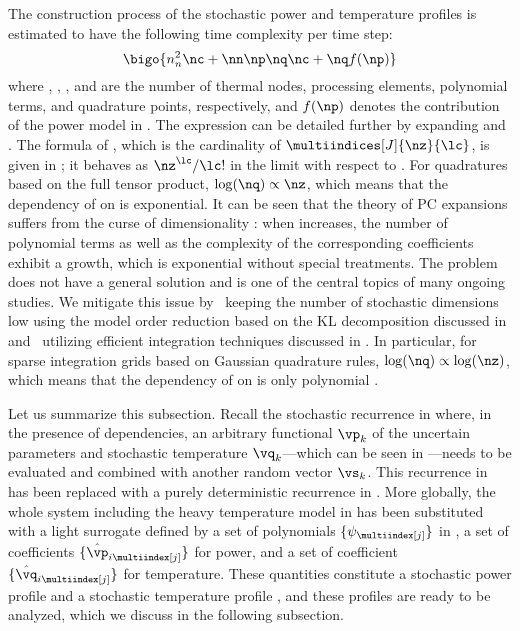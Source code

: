 The construction process of the stochastic power and temperature profiles is
estimated to have the following time complexity per time step:
\[
  \bigo{n_n^2 \nc + \nn \np \nq \nc + \nq f(\np)}
\]
where \nn, \np, \nc, and \nq are the number of thermal nodes, processing
elements, polynomial terms, and quadrature points, respectively, and $f(\np)$
denotes the contribution of the power model in . The
expression can be detailed further by expanding \nc and \nq. The formula of \nc,
which is the cardinality of $\multiindices[J]{\nz}{\lc}$, is given in
; it behaves as $\nz^\lc / \lc!$ in the
limit with respect to \nz. For quadratures based on the full tensor product,
$\log(\nq) \propto \nz$, which means that the dependency of \nq on \nz is
exponential. It can be seen that the theory of \ac{PC} expansions suffers from
the curse of dimensionality \cite{eldred2008, xiu2010}: when \nz increases, the
number of polynomial terms as well as the complexity of the corresponding
coefficients exhibit a growth, which is exponential without special treatments.
The problem does not have a general solution and is one of the central topics of
many ongoing studies. We mitigate this issue by \one~keeping the number of
stochastic dimensions low using the model order reduction based on the \ac{KL}
decomposition discussed in  and \two~utilizing
efficient integration techniques discussed in . In
particular, for sparse integration grids based on Gaussian quadrature rules,
$\log(\nq) \propto \log(\nz)$, which means that the dependency of \nq on \nz is
only polynomial \cite{heiss2008}.

Let us summarize this subsection. Recall the stochastic recurrence in
 where, in the presence of dependencies, an
arbitrary functional $\vp_k$ of the uncertain parameters \vu and stochastic
temperature $\vq_k$---which can be seen in ---needs to
be evaluated and combined with another random vector $\vs_k$. This recurrence in
 has been replaced with a purely deterministic
recurrence in . More globally, the whole system including
the heavy temperature model in  has been
substituted with a light surrogate defined by a set of polynomials $\{
\psi_{\multiindex[j]} \}$ in \vz, a set of coefficients $\{ \hat{\vp}_{i
\multiindex[j]} \}$ for power, and a set of coefficient $\{ \hat{\vq}_{i
\multiindex[j]} \}$ for temperature. These quantities constitute a stochastic
power profile \mp and a stochastic temperature profile \mq, and these profiles
are ready to be analyzed, which we discuss in the following subsection.

